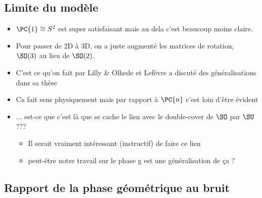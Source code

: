 \subsection{\todo Limite du modèle}\label{subsec:limite2model}

\begin{itemize}
	
	\item $\PC{1} \cong S^2$ est super satisfaisant mais au dela c'est beaucoup moins claire.
	
	\item Pour passer de 2D à 3D, on a juste augmenté les matrices de rotation, \ie~$\SO(3)$ au lieu de $\SO(2)$. 
	
	\item C'est ce qu'on fait par Lilly \& Olhede \cite{lilly_modulated_2011} et Lefèvre a discuté des généralisations dans sa thèse \cite{lefevre_polarization_2021}
	
	\item Ca fait sens physiquement mais par rapport à $\PC{n}$ c'est loin d'être évident
	
	\item ... est-ce que c'est là que se cache le lien avec le double-cover de $\SO$ par $\SU$ ???
	\begin{itemize}
		\item Il serait vraiment intéressant (instructif) de faire ce lien 
		
		\item peut-être notre travail sur le phase g est une généralisation de ça ? 
	\end{itemize}
	
\end{itemize}



\subsection{\todo Rapport de la phase géométrique au bruit}\label{subsec:rapportObruit}

